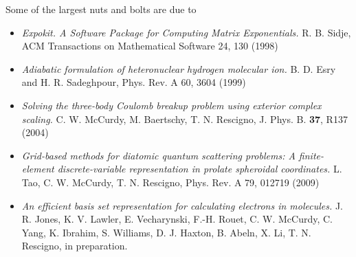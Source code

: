 \documentclass[10pt,leqno, oneside]{book}
\begin{document}
%
Some of the largest nuts and bolts are due to
\begin{itemize}[noitemsep]
%
\item{\textit{{\sc Expokit.} {A} Software Package for Computing Matrix Exponentials.} R. B. Sidje, ACM Transactions on Mathematical Software 24, 130 (1998)}
\item{\textit{Adiabatic formulation of heteronuclear hydrogen molecular ion.} B. D. Esry and H. R. Sadeghpour, Phys. Rev. A 60, 3604 (1999)}
\item{\textit{Solving the three-body Coulomb breakup problem using exterior complex scaling.}  C. W. McCurdy, M. Baertschy, T. N. Rescigno, J. Phys. B. \textbf{37}, R137 (2004)}
\item{\textit{Grid-based methods for diatomic quantum scattering problems: A finite-element discrete-variable
representation in prolate spheroidal coordinates.}  L. Tao, C. W. McCurdy, T. N. Rescigno, Phys. Rev. A 79, 012719 (2009)}
\item{\textit{An efficient basis set representation for calculating electrons in molecules.}
J. R. Jones, K. V. Lawler, E. Vecharynski, F.-H. Rouet,
C. W. McCurdy, C. Yang, K. Ibrahim, S. Williams,  D. J. Haxton, B. Abeln, X. Li,  T. N. Rescigno, in preparation.}        
%
\end{itemize}

\end{document}
